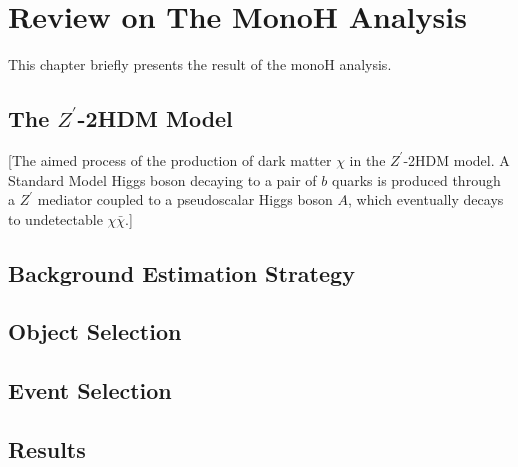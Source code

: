 \documentclass[class=NTHU_thesis, crop=false]{standalone}
\begin{document}
\chapter{Review on The MonoH Analysis}
This chapter briefly presents the result of the monoH analysis.

\section{The $Z^\prime$-2HDM Model}

[The aimed process of the production of dark matter $\chi$ in the $Z^\prime$-2HDM model. A Standard Model Higgs boson decaying to a pair of $b$ quarks is produced through a $Z^\prime$ mediator coupled to a pseudoscalar Higgs boson $A$, which eventually decays to undetectable $\chi\bar{\chi}$.]

\section{Background Estimation Strategy}

\section{Object Selection}

\section{Event Selection}

\section{Results}
\end{document}
